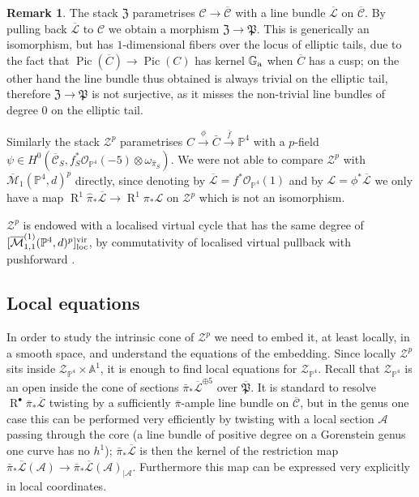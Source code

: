 \documentclass[11pt]{amsart}
\newcommand{\pazocal}{\mathcal}
\newcommand{\oM}{\overline{\mathcal{M}}}
\newcommand{\Mone}[3]{\overline{\pazocal M}^{(1)}_{1,#1}(#2,#3)}
\newcommand{\Zp}{\pazocal Z^p}
\newcommand{\XP}{\mathfrak Z}
\newcommand{\PP}{\mathbb P}
\newcommand{\OO}{\mathcal{O}}
\renewcommand{\to}{\rightarrow}
\newcommand{\Aaff}{\mathbb{A}}
\newcommand{\Pic}{\operatorname{Pic}}
\newcommand{\R}{\operatorname{R}^{\bullet}}
\newcommand{\cC}{\mathcal{C}}
\newcommand{\hC}{\overline{\mathcal{C}}}
\newcommand{\hP}{\overline{\mathfrak{P}}}
\newcommand{\hL}{\overline{\mathcal{L}}}
\theoremstyle{definition}
\theoremstyle{definition}
\newtheorem{rmk}[thm]{Remark}
\begin{document}
\begin{rmk}
The stack $\XP$ parametrises $\cC\to \hC$ with a line bundle $\hL$ on $\hC$. By pulling back $\hL$ to $\cC$ we obtain a morphism $\XP\to \mathfrak{P}$. This is generically an isomorphism, but has $1$-dimensional fibers over the locus of elliptic tails, due to the fact that $\Pic(\overline{C})\to\Pic(C)$ has kernel $\mathbb G_{\rm a}$ when $\overline{C}$ has a cusp; on the other hand the line bundle thus obtained is always trivial on the elliptic tail, therefore $\XP\to \mathfrak{P}$ is not surjective, as it misses the non-trivial line bundles of degree $0$ on the elliptic tail.

Similarly the stack $\mathcal Z^p$ parametrises $C\xrightarrow{\phi}\bar{C}\xrightarrow{\bar{f}} \PP^4$ with a $p$-field $\psi\in H^0(\hC_S,f_S^*\OO_{\PP^4}(-5)\otimes\omega_{\hat\pi_S})$. We were not able to compare $\Zp$ with $\oM_1(\PP^4,d)^p$ directly, since denoting by $\hL=f^*\OO_{\PP^4}(1)$ and by $\mathcal L=\phi^*\hL$ we only have a map $\operatorname{R}^1\hat\pi_*\hL\to\operatorname{R}^1\pi_*\mathcal L$ on $\Zp$ which is not an isomorphism.
\end{rmk}

$\mathcal Z^p$ is endowed with a localised virtual cycle that has the same degree of $[\Mone{1}{\PP^4}{d}^p]^{\rm{vir}}_{\rm{loc}}$, by commutativity of localised virtual pullback with pushforward \cite[Lemma 4.17]{BCM}.

\subsection{Local equations} In order to study the intrinsic cone of $\Zp$ we need to embed it, at least locally, in a smooth space, and understand the equations of the embedding. Since locally $\Zp$ sits inside $\mathcal Z_{\PP^4}\times \Aaff^1$, it is enough to find local equations for $\mathcal Z_{\PP^4}$. Recall that $\mathcal Z_{\PP^4}$ is an open inside the cone of sections $\bar{\pi}_*\hL^{\oplus 5}$ over $\hP$. It is standard to resolve $\R\bar{\pi}_*\hL$ twisting by a sufficiently $\bar{\pi}$-ample line bundle on $\hC$, but in the genus one case this can be performed very efficiently by twisting with a local section $\mathcal A$ passing through the core (a line bundle of positive degree on a Gorenstein genus one curve has no $h^1$); $\bar{\pi}_*\hL$ is then the kernel of the restriction map $\bar{\pi}_*\hL(\mathcal A)\to \bar{\pi}_*\hL(\mathcal A)_{|\mathcal A}$. Furthermore this map can be expressed very explicitly in local coordinates.
\end{document}
